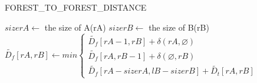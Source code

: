 \IncMargin{1em}
\begin{algorithm}
  \caption{FOREST\_TO\_FOREST\_DISTANCE}
  $sizerA \gets$ the size of A(rA)\;
  $sizerB \gets$ the size of B(rB)\;
  $\widetilde{D_f}[rA, rB] \gets min \begin{cases}
	\widetilde{D_f}[rA - 1, rB] + \delta(rA, \varnothing)\\
	\widetilde{D_f}[rA, rB - 1] + \delta(\varnothing, rB)\\
	\widetilde{D_f}[rA - sizerA, lB - sizerB] + \widetilde{D_t}[rA, rB]
  \end{cases}  
  $
\end{algorithm}